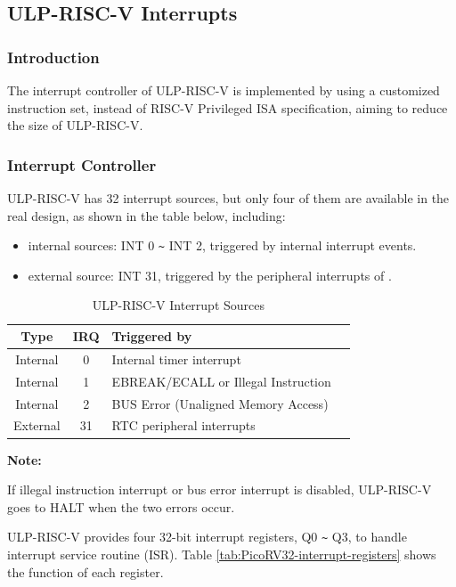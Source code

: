 \documentclass[main\_\_EN.tex]{subfiles}
\begin{document}
\subsection{ULP-RISC-V Interrupts} \label{ulp-risc-v-interrupts}

\subsubsection{Introduction}

The interrupt controller of ULP-RISC-V is implemented by using a customized instruction set, instead of RISC-V Privileged ISA specification, aiming to reduce the size of ULP-RISC-V.

\subsubsection{Interrupt Controller}

ULP-RISC-V has 32 interrupt sources, but only four of them are available in the real design, as shown in the table below, including:
\begin{itemize}
    \item internal sources: INT 0 \verb+~+ INT 2, triggered by internal interrupt events.
    \item external source: INT 31, triggered by the peripheral interrupts of \chipname{}.
\end{itemize}
\begin{table}[H]
    \centering
    \begin{tabular}{ c c l l }
    \textbf{Type} & \textbf{IRQ} & \textbf{Triggered by} \\ \hline
    Internal & 0 & Internal timer interrupt \\
    Internal & 1 & EBREAK/ECALL or Illegal Instruction \\
    Internal & 2 & BUS Error (Unaligned Memory Access) \\
    External & 31 & RTC peripheral interrupts \\
    \end{tabular}
    \caption{ULP-RISC-V Interrupt Sources}
    \label{tab:PicoRV32-interrupt-list-1}
\end{table}

\textbf{Note:}

If illegal instruction interrupt or bus error interrupt is disabled, ULP-RISC-V goes to HALT when the two errors occur.

ULP-RISC-V provides four 32-bit interrupt registers, Q0 \verb+~+ Q3, to handle interrupt service routine (ISR). Table \ref{tab:PicoRV32-interrupt-registers} shows the function of each register.
\end{document}
